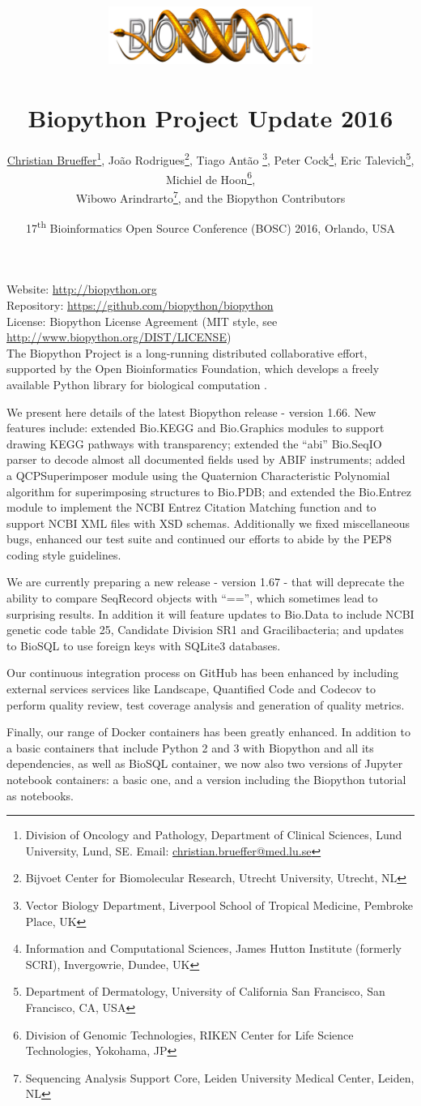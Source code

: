 \documentclass[10pt,oneside]{article}
\title{%
\vspace{-1.5in}
\includegraphics[width=0.5\textwidth]{biopython.jpg}\\
~\\Biopython Project Update 2016}
\author{
	\underline{Christian Brueffer}\footnote{Division of Oncology and Pathology, Department of Clinical Sciences, Lund University, Lund, SE. Email: \href{mailto:christian.brueffer@med.lu.se}{christian.brueffer@med.lu.se}},
    Jo\~{a}o Rodrigues\footnote{Bijvoet Center for Biomolecular Research, Utrecht University, Utrecht, NL},
    Tiago Ant\~{a}o \footnote{Vector Biology Department, Liverpool School of Tropical Medicine, Pembroke Place, UK},
    Peter Cock\footnote{Information and Computational Sciences, James Hutton Institute (formerly SCRI), Invergowrie, Dundee, UK},
    Eric Talevich\footnote{Department of Dermatology, University of California San Francisco, San Francisco, CA, USA},
    Michiel de Hoon\footnote{Division of Genomic Technologies, RIKEN Center for Life Science Technologies, Yokohama, JP},
		\\
    Wibowo Arindrarto\footnote{Sequencing Analysis Support Core, Leiden University Medical Center, Leiden, NL},
    and the Biopython Contributors}
\date{17\textsuperscript{th} Bioinformatics Open Source Conference (BOSC) 2016, Orlando, USA}
\begin{document}
\maketitle
\thispagestyle{empty}

\vspace{-0.2in}
\noindent
Website: \url{http://biopython.org} \\
Repository: \url{https://github.com/biopython/biopython} \\
License: Biopython License Agreement (MIT style, see \url{http://www.biopython.org/DIST/LICENSE}) \\

The Biopython Project is a long-running distributed collaborative effort,
supported by the Open Bioinformatics Foundation, which develops a freely
available Python library for biological computation \cite{AppNote}.

We present here details of the latest Biopython release - version 1.66. New
features include: extended Bio.KEGG and Bio.Graphics modules to support drawing
KEGG pathways with transparency; extended the ``abi'' Bio.SeqIO parser to decode
almost all documented fields used by ABIF instruments; added a QCPSuperimposer
module using the Quaternion Characteristic Polynomial algorithm for superimposing
structures to Bio.PDB; and extended the Bio.Entrez module to implement the NCBI
Entrez Citation Matching function and to support NCBI XML files with XSD schemas.
Additionally we fixed miscellaneous bugs, enhanced our test suite and continued our
efforts to abide by the PEP8 coding style guidelines.

We are currently preparing a new release - version 1.67 - that will deprecate the
ability to compare SeqRecord objects with ``=='', which sometimes lead to surprising
results.  In addition it will feature updates to Bio.Data to include NCBI genetic
code table 25, Candidate Division SR1 and Gracilibacteria; and updates to BioSQL to
use foreign keys with SQLite3 databases.

Our continuous integration process on GitHub has been enhanced by including
external services services like Landscape, Quantified Code and Codecov to perform
quality review, test coverage analysis and generation of quality metrics.

Finally, our range of Docker containers has been greatly enhanced. In addition to
a basic containers that include Python 2 and 3 with Biopython and all its
dependencies, as well as BioSQL container, we now also two versions of Jupyter
notebook containers: a basic one, and a version including the Biopython tutorial as
notebooks.
\end{document}
